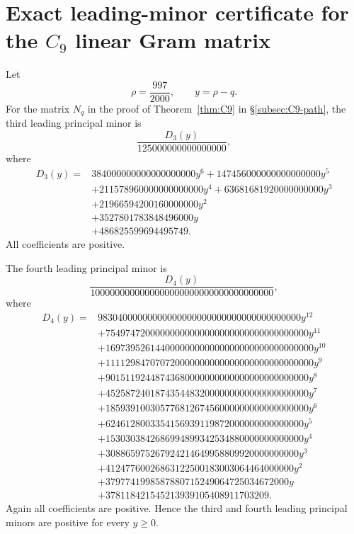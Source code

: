 \documentclass[11pt]{article}
\begin{document}
\appendix

\section{Exact leading-minor certificate for the $C_9$ linear Gram matrix}\label{app:C9-minors}

Let
\[
        \rho=\frac{997}{2000},
        \qquad
        y=\rho-q.
\]
For the matrix $N_q$ in the proof of Theorem~\ref{thm:C9} in \S\ref{subsec:C9-path}, the third leading principal minor is
\[
\frac{D_3(y)}{125000000000000000},
\]
where
\[
\begin{aligned}
D_3(y)={}&384000000000000000000y^6
+147456000000000000000y^5\\
&+211578960000000000000y^4
+63681681920000000000y^3\\
&+21966594200160000000y^2\\
&+3527801783848496000y\\
&+486825599694495749.
\end{aligned}
\]
All coefficients are positive.

The fourth leading principal minor is
\[
\frac{D_4(y)}{1000000000000000000000000000000000000},
\]
where
\[
\begin{aligned}
D_4(y)={}&98304000000000000000000000000000000000000y^{12}\\
&+75497472000000000000000000000000000000000y^{11}\\
&+169739526144000000000000000000000000000000y^{10}\\
&+111129847070720000000000000000000000000000y^9\\
&+90151192448743680000000000000000000000000y^8\\
&+45258724018743544832000000000000000000000y^7\\
&+18593910030577681267456000000000000000000y^6\\
&+6246128003354156939119872000000000000000y^5\\
&+1530303842686994899342534880000000000000y^4\\
&+308865975267924214649958809920000000000y^3\\
&+41247760026863122500183003064464000000y^2\\
&+3797741998587880715249064725034672000y\\
&+378118421545213939105408911703209.
\end{aligned}
\]
Again all coefficients are positive.  Hence the third and fourth leading principal minors are positive for every $y\ge0$.
\end{document}
